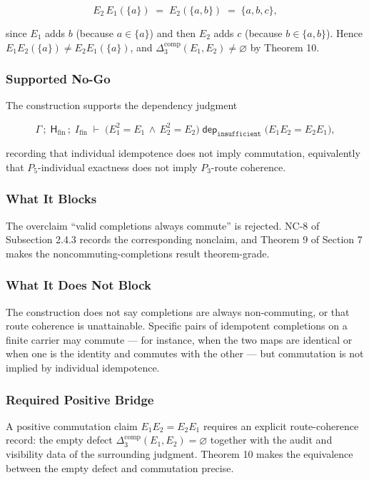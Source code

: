 \documentclass[11pt]{article}
\theoremstyle{definition}
\begin{document}
\[
E_2\,E_1(\{a\})\;=\;E_2(\{a,b\})\;=\;\{a,b,c\},
\]

since \(E_1\) adds \(b\) (because \(a\in\{a\}\)) and then \(E_2\) adds \(c\) (because \(b\in\{a,b\}\)). Hence \(E_1E_2(\{a\})\neq E_2E_1(\{a\})\), and \(\Delta_3^{\mathrm{comp}}(E_1,E_2)\neq\varnothing\) by Theorem 10.

\subsubsection{Supported No-Go}

The construction supports the dependency judgment

\[
\Gamma\,;\;\mathsf H_{\mathrm{fin}}\,;\;I_{\mathrm{fin}}\;\vdash\;\bigl(E_1^2=E_1\,\wedge\,E_2^2=E_2\bigr)\;\mathrel{\mathsf{dep}_{\texttt{insufficient}}}\;\bigl(E_1E_2=E_2E_1\bigr),
\]

recording that individual idempotence does not imply commutation, equivalently that \(P_5\)-individual exactness does not imply \(P_3\)-route coherence.

\subsubsection{What It Blocks}

The overclaim ``valid completions always commute'' is rejected. NC-8 of Subsection 2.4.3 records the corresponding nonclaim, and Theorem 9 of Section 7 makes the noncommuting-completions result theorem-grade.

\subsubsection{What It Does Not Block}

The construction does not say completions are always non-commuting, or that route coherence is unattainable. Specific pairs of idempotent completions on a finite carrier may commute --- for instance, when the two maps are identical or when one is the identity and commutes with the other --- but commutation is not implied by individual idempotence.

\subsubsection{Required Positive Bridge}

A positive commutation claim \(E_1E_2=E_2E_1\) requires an explicit route-coherence record: the empty defect \(\Delta_3^{\mathrm{comp}}(E_1,E_2)=\varnothing\) together with the audit and visibility data of the surrounding judgment. Theorem 10 makes the equivalence between the empty defect and commutation precise.
\end{document}
